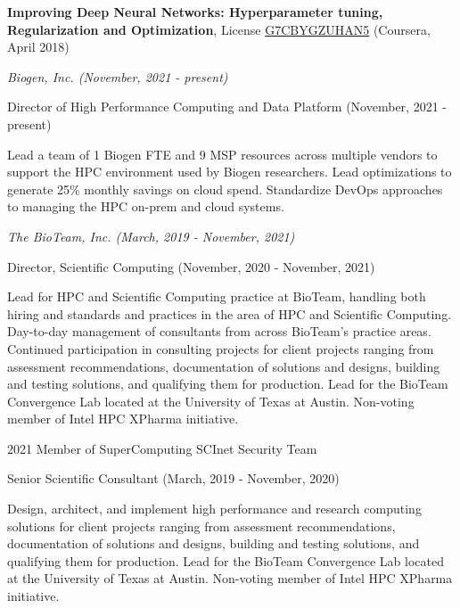 \documentclass[11pt,article,oneside]{memoir}
\begin{document}
\ind \textbf{Improving Deep Neural Networks: Hyperparameter tuning, Regularization and Optimization}, License \href{Improving Deep Neural Networks: Hyperparameter tuning, Regularization and Optimization}{G7CBYGZUHAN5} (Coursera, April 2018)
\bigskip

\medskip
\noindent\emph{Biogen, Inc. (November, 2021 - present) \vspace{0.01in}}

\ind \footnotesize Director of High Performance Computing and Data Platform (November, 2021 - present)

\ind \hspace{0.35in} \footnotesize Lead a team of 1 Biogen FTE and 9 MSP resources across multiple vendors to support the HPC environment used by Biogen researchers. Lead optimizations to generate 25\% monthly savings on cloud spend. Standardize DevOps approaches to managing the HPC on-prem and cloud systems.

\vspace{-0.075in}

\normalsize

\bigskip
\noindent\emph{The BioTeam, Inc. (March, 2019 - November, 2021) \vspace{0.01in}}

\ind \footnotesize Director, Scientific Computing (November, 2020 - November, 2021)

\ind \hspace{0.35in} \footnotesize Lead for HPC and Scientific Computing practice at BioTeam, handling both hiring and standards and practices in the area of HPC and Scientific Computing. Day-to-day management of consultants from across BioTeam's practice areas. Continued participation in consulting projects for client projects ranging
from assessment recommendations, documentation of solutions and designs, building and testing solutions, and qualifying them for production. Lead for the BioTeam Convergence Lab located at the University of Texas at Austin. Non-voting member of Intel HPC XPharma initiative.

\medskip
\ind \hspace{0.35in} \footnotesize 2021 Member of SuperComputing SCInet Security Team
\medskip

\ind \footnotesize Senior Scientific Consultant (March, 2019 - November, 2020)

\ind \hspace{0.35in} \footnotesize Design, architect, and implement high performance and research computing solutions for client projects ranging from assessment recommendations, documentation of solutions and designs, building and testing solutions, and qualifying them for production. Lead for the BioTeam Convergence Lab located at the University of Texas at Austin. Non-voting member of Intel HPC XPharma initiative.
\end{document}
